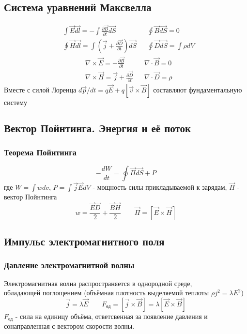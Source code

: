 \documentclass{article}
\begin{document}
\subsection{Система уравнений Максвелла}
\[\boxed{\begin{aligned}
& \int \vec{E}\vec{dl}=-\int \frac{\partial \vec{B}}{\partial t}\vec{dS}  & & \oint \vec{B}\vec{dS}=0 \\
& \oint \vec{H}\vec{dl}=\int(\vec{j}+\frac{\partial \vec{D}}{\partial t})\vec{dS} & & \oint\vec{D}\vec{dS}=\int\rho dV 
\end{aligned}}\]
\[\boxed{\begin{aligned}
& \nabla \times \vec{E}=-\frac{\partial \vec{B}}{\partial t} & & \nabla \cdot \vec{B}=0 \\
& \nabla \times \vec{H} = \vec{j} + \frac{\partial \vec{D}}{\partial t} & & \nabla \cdot \vec{D} = \rho
\end{aligned}}\]
Вместе с силой Лоренца $d\vec{p}/dt=q\vec{E}+q[\vec{v}\times\vec{B}]$ составляют фундаментальную систему

\subsection{Вектор Пойнтинга. Энергия и её поток}
\subsubsection{Теорема Пойнтинга}
\[-\frac{dW}{dt}=\oint\vec{\Pi}\vec{dS}+P\]
где $W=\int wdv$, $P=\int \vec{j}\vec{E}dV$ - мощность силы прикладываемой к зарядам, $\vec{\Pi}$ - вектор Пойнтинга
\[w=\frac{\vec{E}\vec{D}}{2}+\frac{\vec{B}\vec{H}}{2} \qquad \vec{\Pi}=[\vec{E}\times\vec{H}]\]

\subsection{Импульс электромагнитного поля}
\subsubsection{Давление электромагнитной волны}
Электромагнитная волна распространяется в однородной среде, \\ обладающей поглощением (объёмная плотность выделяемой теплоты $\rho j^2=\lambda E^2$)
\[\vec{j}=\lambda \vec{E} \qquad F_{\text{ед}}=[\vec{j} \times \vec{B}]=\lambda [\vec{E}\times\vec{B}]\]
$F_{\text{ед}}$ - сила на единицу объёма, ответсвенная за появление давления и \\ сонаправленная с вектором скорости волны.
\end{document}
